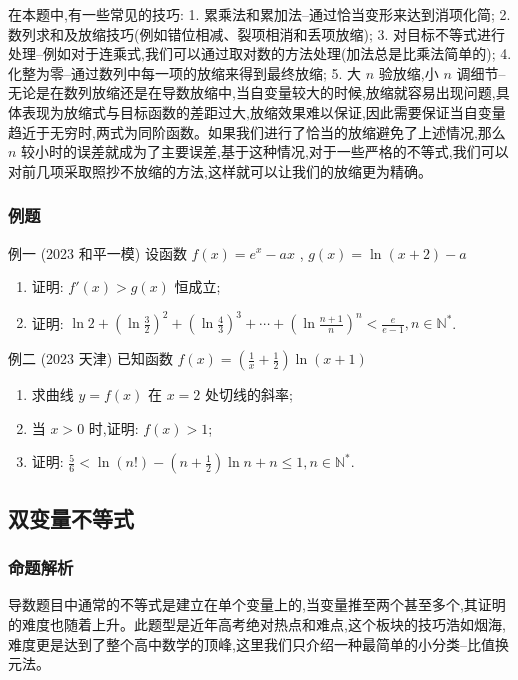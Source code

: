 \documentclass{article}
\begin{document}
在本题中,有一些常见的技巧:
1. 累乘法和累加法--通过恰当变形来达到消项化简;
2. 数列求和及放缩技巧(例如错位相减、裂项相消和丢项放缩);
3. 对目标不等式进行处理--例如对于连乘式,我们可以通过取对数的方法处理(加法总是比乘法简单的);
4. 化整为零--通过数列中每一项的放缩来得到最终放缩;
5. 大 $n$ 验放缩,小 $n$ 调细节--无论是在数列放缩还是在导数放缩中,当自变量较大的时候,放缩就容易出现问题,具体表现为放缩式与目标函数的差距过大,放缩效果难以保证,因此需要保证当自变量趋近于无穷时,两式为同阶函数。如果我们进行了恰当的放缩避免了上述情况,那么 $n$ 较小时的误差就成为了主要误差,基于这种情况,对于一些严格的不等式,我们可以对前几项采取照抄不放缩的方法,这样就可以让我们的放缩更为精确。

\subsubsection{例题}

例一 (2023 和平一模) 设函数 $f(x)=e^x-a x$ , $g(x)=\ln (x+2)-a$
\begin{enumerate}
\item[(1)] 证明: $f'(x)>g(x)$ 恒成立;
\item[(2)] 证明: $\ln 2+\left(\ln \frac{3}{2}\right)^2+\left(\ln \frac{4}{3}\right)^3+\cdots+\left(\ln \frac{n+1}{n}\right)^n<\frac{e}{e-1}, n \in \mathbb{N}^*$.
\end{enumerate}
\vspace{20\baselineskip}

例二 (2023 天津) 已知函数 $f(x)=\left(\frac{1}{x}+\frac{1}{2}\right) \ln (x+1)$
\begin{enumerate}
\item[(1)] 求曲线 $y=f(x)$ 在 $x=2$ 处切线的斜率;
\item[(2)] 当 $x>0$ 时,证明: $f(x)>1$;
\item[(3)] 证明: $\frac{5}{6}<\ln (n!)-\left(n+\frac{1}{2}\right) \ln n+n \leq1, n \in \mathbb{N}^*$.
\end{enumerate}
\vspace{20\baselineskip}

\newpage
\subsection{双变量不等式}
\subsubsection{命题解析}
导数题目中通常的不等式是建立在单个变量上的,当变量推至两个甚至多个,其证明的难度也随着上升。此题型是近年高考绝对热点和难点,这个板块的技巧浩如烟海,难度更是达到了整个高中数学的顶峰,这里我们只介绍一种最简单的小分类--比值换元法。
\end{document}
